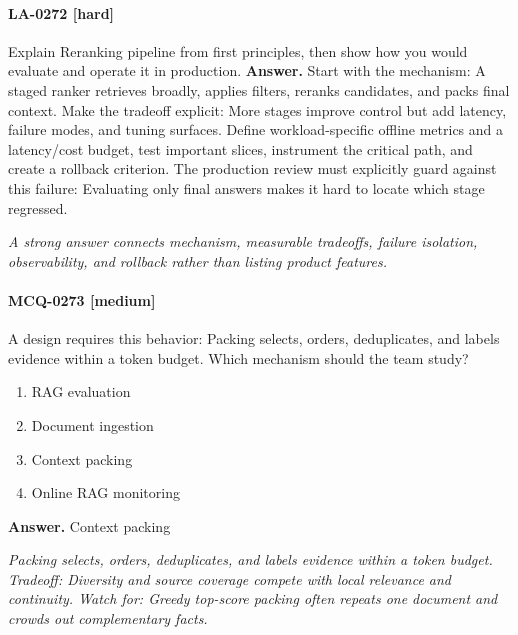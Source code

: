 \paragraph{LA-0272 [hard]} Explain Reranking pipeline from first principles, then show how you would evaluate and operate it in production.
\noindent\textbf{Answer.} Start with the mechanism: A staged ranker retrieves broadly, applies filters, reranks candidates, and packs final context. Make the tradeoff explicit: More stages improve control but add latency, failure modes, and tuning surfaces. Define workload-specific offline metrics and a latency/cost budget, test important slices, instrument the critical path, and create a rollback criterion. The production review must explicitly guard against this failure: Evaluating only final answers makes it hard to locate which stage regressed.
\par\textit{A strong answer connects mechanism, measurable tradeoffs, failure isolation, observability, and rollback rather than listing product features.}
\paragraph{MCQ-0273 [medium]} A design requires this behavior: Packing selects, orders, deduplicates, and labels evidence within a token budget. Which mechanism should the team study?
\begin{enumerate}[label=\Alph*.]
\item RAG evaluation
\item Document ingestion
\item Context packing
\item Online RAG monitoring
\end{enumerate}
\noindent\textbf{Answer.} Context packing
\par\textit{Packing selects, orders, deduplicates, and labels evidence within a token budget. Tradeoff: Diversity and source coverage compete with local relevance and continuity. Watch for: Greedy top-score packing often repeats one document and crowds out complementary facts.}
